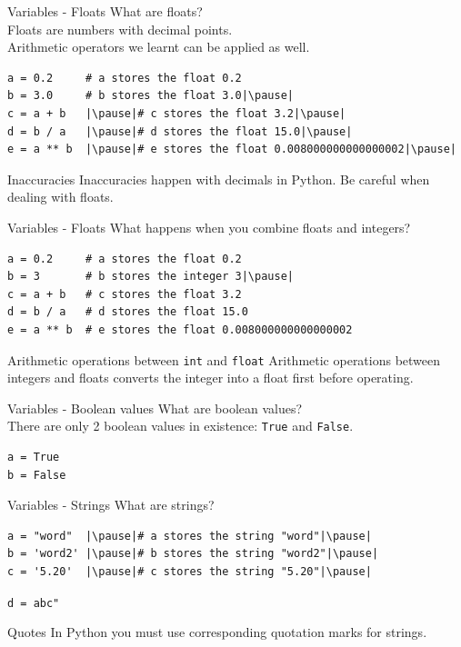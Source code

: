 \documentclass[dvipsnames, svgnames, x11names]{beamer}
\begin{document}
\begin{frame}[fragile]{Variables - Floats}
What are floats?\pause\\
Floats are numbers with decimal points.\pause\\
Arithmetic operators we learnt can be applied as well.
\begin{verbatim}
a = 0.2     # a stores the float 0.2
b = 3.0     # b stores the float 3.0|\pause|
c = a + b   |\pause|# c stores the float 3.2|\pause|
d = b / a   |\pause|# d stores the float 15.0|\pause|
e = a ** b  |\pause|# e stores the float 0.008000000000000002|\pause|
\end{verbatim}
\begin{alertblock}{Inaccuracies}
Inaccuracies happen with decimals in Python. Be careful when dealing with floats.
\end{alertblock}
\end{frame}

\begin{frame}[fragile]{Variables - Floats}
What happens when you combine floats and integers? \pause
\begin{verbatim}
a = 0.2     # a stores the float 0.2
b = 3       # b stores the integer 3|\pause|
c = a + b   # c stores the float 3.2
d = b / a   # d stores the float 15.0
e = a ** b  # e stores the float 0.008000000000000002
\end{verbatim}
\pause
\begin{block}{Arithmetic operations between \texttt{int} and \texttt{float}}
Arithmetic operations between integers and floats converts the integer into a float first before operating.
\end{block}
\end{frame}

\begin{frame}[fragile]{Variables - Boolean values}
What are boolean values?\pause\\
There are only 2 boolean values in existence: \texttt{True} and \texttt{False}.\pause
\begin{verbatim}
a = True
b = False
\end{verbatim}
\end{frame}

\begin{frame}[fragile]{Variables - Strings}
What are strings?\pause\\

\begin{verbatim}
a = "word"  |\pause|# a stores the string "word"|\pause|
b = 'word2' |\pause|# b stores the string "word2"|\pause|
c = '5.20'  |\pause|# c stores the string "5.20"|\pause|
\end{verbatim}
\vspace{-0.275em}
\texttt{d = }{\color{BrickRed}\texttt{\textquotesingle abc"}}\pause {} \pause
\begin{block}{Quotes}
In Python you must use corresponding quotation marks for strings.
\end{block}
\end{frame}
\end{document}
